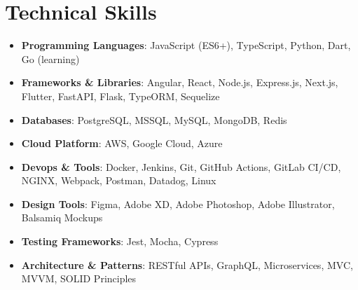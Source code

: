 \section{Technical Skills}
{
	\normalsize
	\begin{itemize}[topsep=0pt, partopsep=0pt, itemsep=0pt, parsep=0pt]
		\item \textbf{Programming Languages}: JavaScript (ES6+), TypeScript, Python, Dart, Go (learning)
		\item \textbf{Frameworks \& Libraries}: Angular, React, Node.js, Express.js, Next.js, Flutter, FastAPI, Flask, TypeORM, Sequelize
		\item \textbf{Databases}: PostgreSQL, MSSQL, MySQL, MongoDB, Redis
		\item \textbf{Cloud Platform}: AWS, Google Cloud, Azure
		\item \textbf{Devops \& Tools}: Docker, Jenkins, Git, GitHub Actions, GitLab CI/CD, NGINX, Webpack, Postman, Datadog, Linux
		\item \textbf{Design Tools}: Figma, Adobe XD, Adobe Photoshop, Adobe Illustrator, Balsamiq Mockups
		\item \textbf{Testing Frameworks}: Jest, Mocha, Cypress
		\item \textbf{Architecture \& Patterns}: RESTful APIs, GraphQL, Microservices, MVC, MVVM, SOLID Principles
	\end{itemize}
}